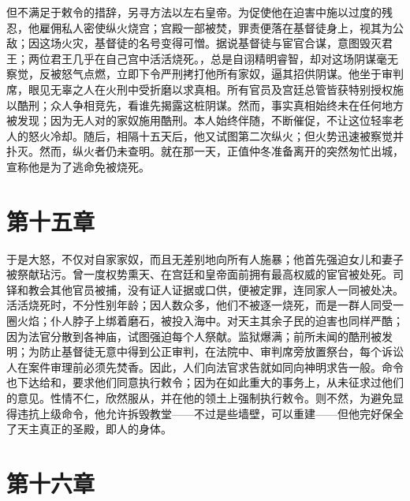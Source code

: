 但不满足于敕令的措辞，另寻方法以左右皇帝。为促使他在迫害中施以过度的残忍，他雇佣私人密使纵火烧宫；宫殿一部被焚，罪责便落在基督徒身上，视其为公敌；因这场火灾，基督徒的名号变得可憎。据说基督徒与宦官合谋，意图毁灭君王；两位君王几乎在自己宫中活活烧死。，总是自诩精明睿智，却对这场阴谋毫无察觉，反被怒气点燃，立即下令严刑拷打他所有家奴，逼其招供阴谋。他坐于审判席，眼见无辜之人在火刑中受折磨以求真相。所有官员及宫廷总管皆获特别授权施以酷刑；众人争相竞先，看谁先揭露这桩阴谋。然而，事实真相始终未在任何地方被发现；因为无人对的家奴施用酷刑。本人始终伴随，不断催促，不让这位轻率老人的怒火冷却。随后，相隔十五天后，他又试图第二次纵火；但火势迅速被察觉并扑灭。然而，纵火者仍未查明。就在那一天，正值仲冬准备离开的突然匆忙出城，宣称他是为了逃命免被烧死。\par


\section{第十五章}

于是大怒，不仅对自家家奴，而且无差别地向所有人施暴；他首先强迫女儿和妻子被祭献玷污。曾一度权势熏天、在宫廷和皇帝面前拥有最高权威的宦官被处死。司铎和教会其他官员被捕，没有证人证据或口供，便被定罪，连同家人一同被处决。活活烧死时，不分性别年龄；因人数众多，他们不被逐一烧死，而是一群人同受一圈火焰；仆人脖子上绑着磨石，被投入海中。对天主其余子民的迫害也同样严酷；因为法官分散到各神庙，试图强迫每个人祭献。监狱爆满；前所未闻的酷刑被发明；为防止基督徒无意中得到公正审判，在法院中、审判席旁放置祭台，每个诉讼人在案件审理前必须先焚香。因此，人们向法官求告就如同向神明求告一般。命令也下达给和，要求他们同意执行敕令；因为在如此重大的事务上，从未征求过他们的意见。性情不仁，欣然服从，并在他的领土上强制执行敕令。则不然，为避免显得违抗上级命令，他允许拆毁教堂——不过是些墙壁，可以重建——但他完好保全了天主真正的圣殿，即人的身体。\par


\section{第十六章}

